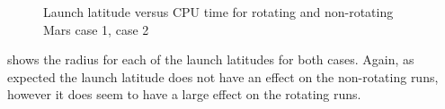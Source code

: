 \begin{figure}[H]
\centering
{} 
\caption{Launch latitude versus CPU time for rotating and non-rotating Mars \protect{} case 1,  \protect{} case 2 } 
\label{fig:launchLatitudeVsCPUcase1combined} 
\end{figure} 

\noindent
{} shows the radius for each of the launch latitudes for both cases. Again, as expected the launch latitude does not have an effect on the non-rotating runs, however it does seem to have a large effect on the rotating runs. 

